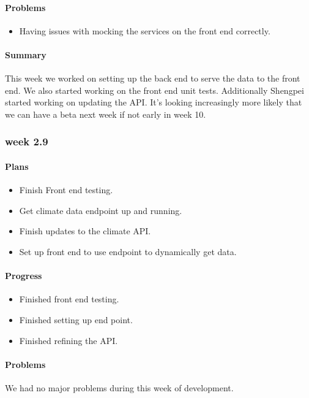 \documentclass[onecolumn, draftclsnofoot,10pt, compsoc]{article}
\begin{document}
			\paragraph{Problems} \hfill \break
				\begin{itemize}
					\item Having issues with mocking the services on the front end correctly.
				\end{itemize}
			\paragraph{Summary} \hfill \break
			This week we worked on setting up the back end to serve the data to the front end. We also started working on the front end unit tests. Additionally Shengpei started working on updating the API. It's looking increasingly more likely that we can have a beta next week if not early in week 10.\\
			
		\subsubsection{week 2.9}
			\paragraph{Plans} \hfill \break
				\begin{itemize}
					\item Finish Front end testing.
					\item Get climate data endpoint up and running.
					\item Finish updates to the climate API.
					\item Set up front end to use endpoint to dynamically get data.
				\end{itemize}
			\paragraph{Progress} \hfill \break
				\begin{itemize}
					\item Finished front end testing.
					\item Finished setting up end point.
					\item Finished refining the API.
				\end{itemize}
			\paragraph{Problems} \hfill \break 
				We had no major problems during this week of development.\\
\end{document}
